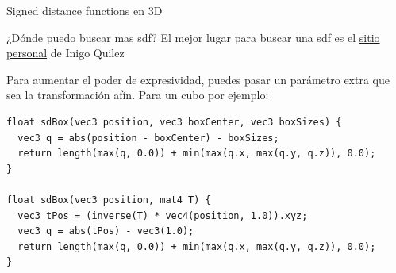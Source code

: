 \begin{frame}[fragile]{Signed distance functions en 3D}
\begin{block}{¿Dónde puedo buscar mas sdf?}
    El mejor lugar para buscar una sdf es el \href{https://iquilezles.org/articles/distfunctions/}{sitio personal} de Inigo Quilez
\end{block}
Para aumentar el poder de expresividad, puedes pasar un parámetro extra que sea la transformación afín.
Para un cubo por ejemplo:
\begin{listing}
\begin{verbatim}
float sdBox(vec3 position, vec3 boxCenter, vec3 boxSizes) {
  vec3 q = abs(position - boxCenter) - boxSizes;
  return length(max(q, 0.0)) + min(max(q.x, max(q.y, q.z)), 0.0);
}

float sdBox(vec3 position, mat4 T) {
  vec3 tPos = (inverse(T) * vec4(position, 1.0)).xyz;
  vec3 q = abs(tPos) - vec3(1.0);
  return length(max(q, 0.0)) + min(max(q.x, max(q.y, q.z)), 0.0);
}
\end{verbatim}
\end{listing}

\end{frame}

